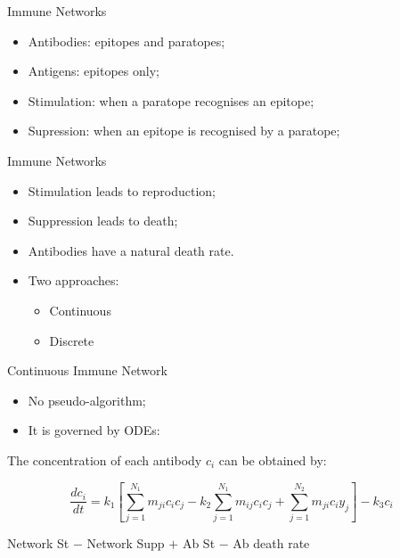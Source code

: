 \documentclass[xcolor=svgnames]{beamer}
\begin{document}
    \begin{frame}{Immune Networks}
        \begin{itemize}
            \item Antibodies: epitopes and paratopes;
            \item Antigens: epitopes only;
            \item Stimulation: when a paratope recognises an epitope;
            \item Supression: when an epitope is recognised by a paratope;
        \end{itemize}
    \end{frame}
    
    \begin{frame}{Immune Networks}
        \begin{itemize}
            \item Stimulation leads to reproduction;
            \item Suppression leads to death;
            \item Antibodies have a natural death rate.
            \item Two approaches:
            \begin{itemize}
                \item Continuous
                \item Discrete
            \end{itemize}
        \end{itemize}
    \end{frame}
    
    \begin{frame}{Continuous Immune Network}
        \begin{itemize}
            \item No pseudo-algorithm;
            \item It is governed by ODEs:
        \end{itemize}
        
        The concentration of each antibody $c_{i}$ can be obtained by:
        
        $$ \frac{dc_{i}}{dt} = k_{1} \left[ \sum^{N_{1}}_{j=1}{m_{ji}c_{i}c_{j}} - k_{2} \sum^{N_{1}}_{j=1}{m_{ij}c_{i}c_{j}} + \sum^{N_{2}}_{j=1}{m_{ji}c_{i}y_{j}} \right] - k_{3}c_{i} $$
        
        \center Network St $-$ Network Supp $+$ Ab St $-$ Ab death rate
        
    \end{frame}
    
\end{document}
